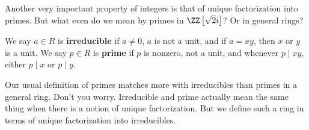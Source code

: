 \documentclass[11pt]{scrartcl}
\begin{document}
Another very important property of integers is that of unique factorization into primes. But what even do we mean by primes in \(\ZZ \left[\sqrt 2 i\right] \)? Or in general rings?

\begin{defn}
We say \(a \in R\) is \textbf{irreducible} if \(a \ne 0\), \(a\) is not a unit, and if \(a=xy\), then \(x\) or \(y\) is a unit. We say \(p \in R\) is \textbf{prime} if \(p\) is nonzero, not a unit, and whenever \(p \mid xy\), either \(p \mid x\) or \(p \mid y\).
\end{defn}

Our usual definition of primes matches more with irreducibles than primes in a general ring. Don't you worry. Irreducible and prime actually mean the same thing when there is a notion of unique factorization. But we define such a ring in terms of unique factorization into irreducibles.
\end{document}
